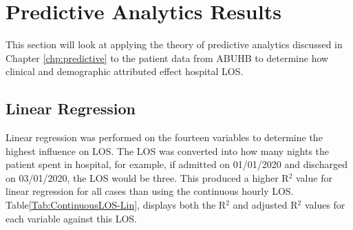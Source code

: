 \documentclass[../thesis.tex]{subfiles}
\begin{document}
\section{Predictive Analytics Results}\label{sec:predictiveresults}
This section will look at applying the theory of predictive analytics discussed in Chapter \ref{chp:predictive} to the patient data from ABUHB to determine how clinical and demographic attributed effect hospital LOS.
\subsection{Linear Regression}\label{sec:linregresults}
Linear regression was performed on the fourteen variables to determine the highest influence on LOS. The LOS was converted into how many nights the patient spent in hospital, for example, if admitted on 01/01/2020 and discharged on 03/01/2020, the LOS would be three. This produced a higher R$^{2}$ value for linear regression for all cases than using the continuous hourly LOS. Table\ref{Tab:ContinuousLOS-Lin}, displays both the R$^{2}$ and adjusted R$^{2}$ values for each variable against this LOS.



\begin{table}[h!]
\centering{}
\caption{Linear Regression Result}
\label{Tab:ContinuousLOS-Lin}
\end{table}
\end{document}
